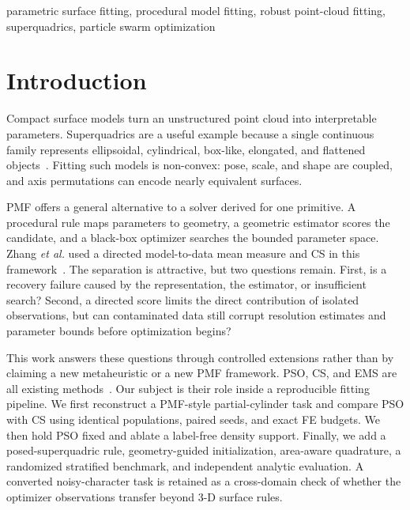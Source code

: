 \documentclass[conference]{IEEEtran}
\begin{document}
\begin{IEEEkeywords}
parametric surface fitting, procedural model fitting, robust point-cloud
fitting, superquadrics, particle swarm optimization
\end{IEEEkeywords}

\section{Introduction}
Compact surface models turn an unstructured point cloud into interpretable
parameters.  Superquadrics are a useful example because a single continuous
family represents ellipsoidal, cylindrical, box-like, elongated, and flattened
objects~\cite{barr1981superquadrics,solina1990recovery}.  Fitting such models is
non-convex: pose, scale, and shape are coupled, and axis permutations can encode
nearly equivalent surfaces.

PMF offers a general alternative to a solver derived for one primitive.  A
procedural rule maps parameters to geometry, a geometric estimator scores the
candidate, and a black-box optimizer searches the bounded parameter space.
Zhang \emph{et al.} used a directed model-to-data mean measure and CS in this
framework~\cite{zhang2019pmf}.  The separation is attractive, but two questions
remain.  First, is a recovery failure caused by the representation, the
estimator, or insufficient search?  Second, a directed score limits the direct
contribution of isolated observations, but can contaminated data still corrupt
resolution estimates and parameter bounds before optimization begins?

This work answers these questions through controlled extensions rather than by
claiming a new metaheuristic or a new PMF framework.  PSO, CS, and EMS are all
existing methods~\cite{kennedy1995pso,yang2009cuckoo,liu2022ems}.  Our subject is
their role inside a reproducible fitting pipeline.  We first reconstruct a
PMF-style partial-cylinder task and compare PSO with CS using identical
populations, paired seeds, and exact FE budgets.  We then hold PSO fixed and
ablate a label-free density support.  Finally, we add a posed-superquadric rule,
geometry-guided initialization, area-aware quadrature, a randomized stratified
benchmark, and independent analytic evaluation.  A converted noisy-character
task is retained as a cross-domain check of whether the optimizer observations
transfer beyond 3-D surface rules.
\end{document}
